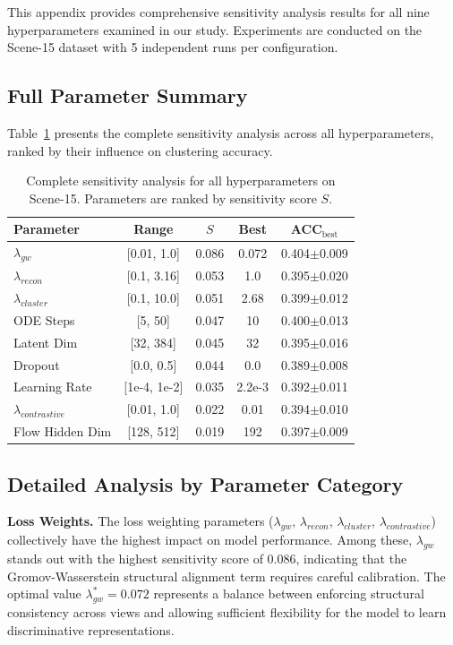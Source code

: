 \documentclass{article}
\theoremstyle{plain}
\theoremstyle{definition}
\theoremstyle{remark}
\begin{document}
This appendix provides comprehensive sensitivity analysis results for all nine hyperparameters examined in our study. Experiments are conducted on the Scene-15 dataset with 5 independent runs per configuration.

\subsection{Full Parameter Summary}

Table~\ref{tab:sensitivity_full} presents the complete sensitivity analysis across all hyperparameters, ranked by their influence on clustering accuracy.

\begin{table}[!htbp]
\caption{Complete sensitivity analysis for all hyperparameters on Scene-15. Parameters are ranked by sensitivity score $S$.}
\label{tab:sensitivity_full}
\vskip 0.1in
\centering
\begin{tabular}{lcccc}
\toprule
Parameter & Range & $S$ & Best & ACC$_{\text{best}}$ \\
\midrule
$\lambda_{gw}$        & [0.01, 1.0]   & 0.086 & 0.072 & 0.404$\pm$0.009 \\
$\lambda_{recon}$     & [0.1, 3.16]   & 0.053 & 1.0   & 0.395$\pm$0.020 \\
$\lambda_{cluster}$   & [0.1, 10.0]   & 0.051 & 2.68  & 0.399$\pm$0.012 \\
ODE Steps             & [5, 50]       & 0.047 & 10    & 0.400$\pm$0.013 \\
Latent Dim            & [32, 384]     & 0.045 & 32    & 0.395$\pm$0.016 \\
Dropout               & [0.0, 0.5]    & 0.044 & 0.0   & 0.389$\pm$0.008 \\
Learning Rate         & [1e-4, 1e-2]  & 0.035 & 2.2e-3& 0.392$\pm$0.011 \\
$\lambda_{contrastive}$ & [0.01, 1.0] & 0.022 & 0.01  & 0.394$\pm$0.010 \\
Flow Hidden Dim       & [128, 512]    & 0.019 & 192   & 0.397$\pm$0.009 \\
\bottomrule
\end{tabular}%
\end{table}

\subsection{Detailed Analysis by Parameter Category}

\textbf{Loss Weights.} The loss weighting parameters ($\lambda_{gw}$, $\lambda_{recon}$, $\lambda_{cluster}$, $\lambda_{contrastive}$) collectively have the highest impact on model performance. Among these, $\lambda_{gw}$ stands out with the highest sensitivity score of 0.086, indicating that the Gromov-Wasserstein structural alignment term requires careful calibration. The optimal value $\lambda_{gw}^* = 0.072$ represents a balance between enforcing structural consistency across views and allowing sufficient flexibility for the model to learn discriminative representations.
\end{document}
